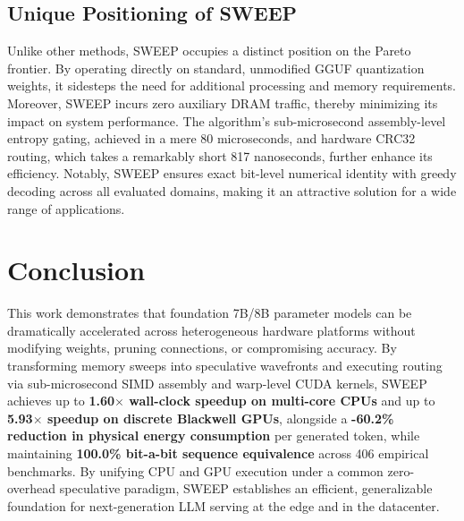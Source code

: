\documentclass[journal,10pt,twocolumn]{article}
\theoremstyle{definition}
\begin{document}
\subsection{Unique Positioning of SWEEP}
Unlike other methods, SWEEP occupies a distinct position on the Pareto frontier. By operating directly on standard, unmodified GGUF quantization weights, it sidesteps the need for additional processing and memory requirements. Moreover, SWEEP incurs zero auxiliary DRAM traffic, thereby minimizing its impact on system performance. The algorithm's sub-microsecond assembly-level entropy gating, achieved in a mere 80 microseconds, and hardware CRC32 routing, which takes a remarkably short 817 nanoseconds, further enhance its efficiency. Notably, SWEEP ensures exact bit-level numerical identity with greedy decoding across all evaluated domains, making it an attractive solution for a wide range of applications.

\section{Conclusion}

This work demonstrates that foundation 7B/8B parameter models can be dramatically accelerated across heterogeneous hardware platforms without modifying weights, pruning connections, or compromising accuracy. By transforming memory sweeps into speculative wavefronts and executing routing via sub-microsecond SIMD assembly and warp-level CUDA kernels, SWEEP achieves up to \textbf{1.60$\times$ wall-clock speedup on multi-core CPUs} and up to \textbf{5.93$\times$ speedup on discrete Blackwell GPUs}, alongside a \textbf{-60.2\% reduction in physical energy consumption} per generated token, while maintaining \textbf{100.0\% bit-a-bit sequence equivalence} across 406 empirical benchmarks. By unifying CPU and GPU execution under a common zero-overhead speculative paradigm, SWEEP establishes an efficient, generalizable foundation for next-generation LLM serving at the edge and in the datacenter.
\end{document}

